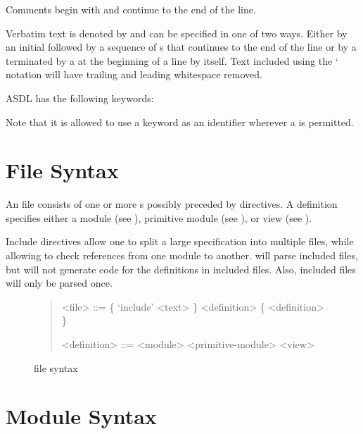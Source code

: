 Comments begin with \lit{--}
and continue to the end of the line.

Verbatim text is denoted by  and can be specified in one of two ways.
Either by an initial \lit{:} followed by a sequence of s that
continues to the end of the line or by a \lit{\%\%} terminated by a \lit{\%\%}
at the beginning of a line by itself. 
Text included using the `\lit{:} notation will have trailing and leading 
whitespace removed.

ASDL has the following keywords:
\begin{quote}
     
     
\end{quote}%
Note that it is allowed to use a keyword as an identifier wherever a  is permitted.

\section{File Syntax}

An \asdl{} file consists of one or more s possibly preceded by 
directives.
A definition specifies either a module (see ),
primitive module (see ),
or view (see ).

Include directives allow one to split a large \asdl{} specification into multiple files,
while allowing \asdlgen{} to check references from one module to another.
\asdlgen{} will parse included files, but will not generate code for the definitions in included
files.
Also, included files will only be parsed once.

\begin{figure}[t]
  \begin{quote}
    \begin{grammar}
      <file>  ::=  \{ `include' <text> \} <definition> \{ <definition> \}
      
      <definition> ::= <module>
        \alt{} <primitive-module>
        \alt{} <view>
    \end{grammar}
  \end{quote}
  \caption{\asdl{} file syntax}
  \label{fig:file-syntax}
\end{figure}%

\section{Module Syntax}
\label{sec:module-syntax}

